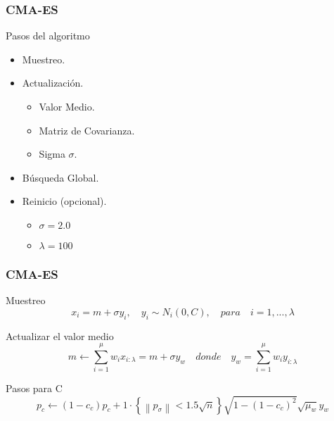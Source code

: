 \begin{frame}
\frametitle{CMA-ES}
\begin{block}{Pasos del algoritmo}
\begin{itemize}
\item Muestreo.
\item Actualización.
  \begin{itemize}
    \item Valor Medio.
    \item Matriz de Covarianza.
    \item Sigma $\sigma$.
    \end{itemize}
\item Búsqueda Global.
\item Reinicio (opcional).
\begin{itemize}
  \item $\sigma = 2.0$
  \item $\lambda = 100$
  \end{itemize}
\end{itemize}
 \end{block}
\end{frame}

\begin{frame}
\frametitle{CMA-ES}
\begin{block}{Muestreo}
  \begin{equation}\label{eq:1}
        x_{i} = m + \sigma y_{i},\quad y_{i}\sim N_{i}(0, C),\quad para\quad i=1,...,\lambda 
  \end{equation}
\end{block}
\begin{block}{Actualizar el valor medio}
  \begin{equation} \label{eq:2}
    m \leftarrow \sum_{i=1}^{\mu} w_{i}x_{i:\lambda} = m + \sigma y_{w}\quad donde\quad y_{w} = \sum_{i=1}^{\mu} w_{i}y_{i:\lambda} 
\end{equation}
\end{block}
\begin{block}{Pasos para C}
  \begin{equation} \label{eq:3}
   p_{c} \leftarrow (1 - c_{c})p_{c} + 1\cdot\left \{ \left \|p_{\sigma}\right \|< 1.5 \sqrt{n} \right \} \sqrt{1 - (1 - c_{c})^2}\sqrt{\mu_{w}}y_{w} 
\end{equation}
\end{block}
\end{frame}

